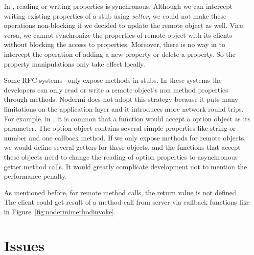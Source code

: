 In \js{}, reading or writing properties is synchronous.
Although we can intercept writing existing properties of a stub using
\emph{setter}, we could not make these operations non-blocking if we decided to update
the remote object as well.
Vice versa, we cannot synchronize the properties of remote object with its clients without
blocking the access to properties.
Moreover, there is no way in \js{} to intercept the operation of adding a new property or delete
a property.
So the property manipulations only take effect locally.

Some RPC systems~\cite{birrell1993distributed} only expose methods in stubs.
In these systems the developers can only read or write a remote object's
non method properties through methods.
Nodermi does not adopt this strategy because it puts many limitations on the
application layer and it introduces more network round trips.
For example, in \js{}, it is common that a function would accept
a option object as its parameter. 
The option object contains several simple properties like string or number 
and one callback method.
If we only expose methods for remote objects, we would define several getters 
for these objects, and the functions that accept these objects 
need to change the reading of option properties to asynchronous getter method calls.
It would greatly complicate development not to mention the performance penalty.


As mentioned before, for remote method calls, the return value is not defined.
The client could get result of a method call
from server via callback functions like in Figure~\ref{fig:nodermimethodinvoke}.




\section{Issues}

